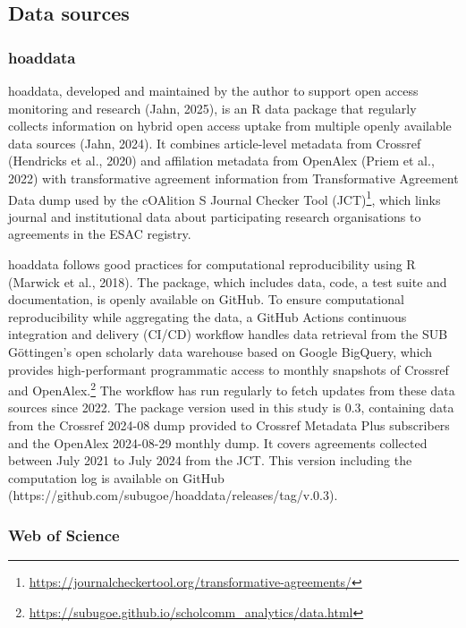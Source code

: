 \documentclass[a4paper,man,floatsintext,longtable,noextraspace,10pt]{apa6}
\begin{document}
\subsection{Data sources}\label{data-sources}

\subsubsection{hoaddata}\label{hoaddata}

hoaddata, developed and maintained by the author to support open access
monitoring and research (Jahn, 2025), is an R data package that
regularly collects information on hybrid open access uptake from
multiple openly available data sources (Jahn, 2024). It combines
article-level metadata from Crossref (Hendricks et al., 2020) and
affilation metadata from OpenAlex (Priem et al., 2022) with
transformative agreement information from Transformative Agreement Data
dump used by the cOAlition S Journal Checker Tool (JCT)\footnote{\url{https://journalcheckertool.org/transformative-agreements/}},
which links journal and institutional data about participating research
organisations to agreements in the ESAC registry.

hoaddata follows good practices for computational reproducibility using
R (Marwick et al., 2018). The package, which includes data, code, a test
suite and documentation, is openly available on GitHub. To ensure
computational reproducibility while aggregating the data, a GitHub
Actions continuous integration and delivery (CI/CD) workflow handles
data retrieval from the SUB Göttingen's open scholarly data warehouse
based on Google BigQuery, which provides high-performant programmatic
access to monthly snapshots of Crossref and OpenAlex.\footnote{\url{https://subugoe.github.io/scholcomm_analytics/data.html}}
The workflow has run regularly to fetch updates from these data sources
since 2022. The package version used in this study is 0.3, containing
data from the Crossref 2024-08 dump provided to Crossref Metadata Plus
subscribers and the OpenAlex 2024-08-29 monthly dump. It covers
agreements collected between July 2021 to July 2024 from the JCT. This
version including the computation log is available on GitHub
(https://github.com/subugoe/hoaddata/releases/tag/v.0.3).

\subsubsection{Web of Science}\label{web-of-science}
\end{document}
